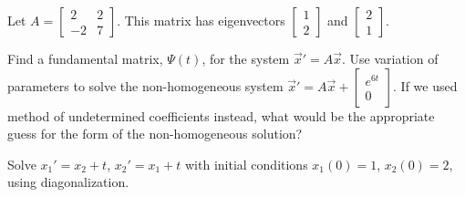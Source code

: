 \documentclass{ximera}
\begin{document}
\begin{exercise}
    Let $A=\displaystyle \begin{bmatrix}2&2\\-2&7\end{bmatrix}$. This matrix has eigenvectors $\displaystyle \begin{bmatrix} 1 \\ 2 \end{bmatrix}$ and $\displaystyle \begin{bmatrix} 2 \\ 1 \end{bmatrix}$.
    \begin{tasks}
        \task Find a fundamental matrix, $\Psi(t)$, for the system $\vec{x}'=A\vec{x}$.
        \task Use variation of parameters to solve the non-homogeneous system $\vec{x}'=A\vec{x}+\displaystyle \begin{bmatrix}e^{6t} \\ 0 \end{bmatrix}$.
        \task If we used method of undetermined coefficients instead, what would be the appropriate guess for the form of the non-homogeneous solution?
    \end{tasks}
\end{exercise}

\begin{exercise}%
    Solve $x_1' = x_2 + t$, $x_2' = x_1 +t$ with initial conditions $x_1(0) = 1$, $x_2(0) = 2$, using diagonalization. %
\end{exercise}
\end{document}
